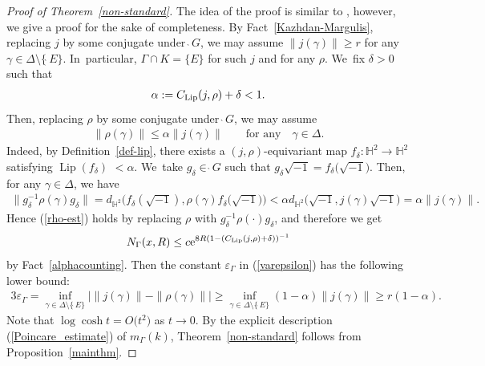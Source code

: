\documentclass[pdftex]{sigma}
\numberwithin{equation}{section}
\begin{document}
\begin{proof}[Proof of Theorem~\ref{non-standard}]
The idea of the proof is similar to \cite[Theorem~9.9]{KaKob16},
however, we give a proof for the sake of completeness.
By Fact~\ref{Kazhdan-Margulis},
replacing $j$ by some conjugate under $\grave{\ }G$,
we may assume $\|j(\gamma)\|\geq r$ for any
$\gamma\in\Delta\setminus\{\grave{\ }E\}$. In~particular, $\Gamma\cap K=\{E\}$ for such $j$ and for any $\rho$. We~fix $\delta>0$ such that
\begin{gather*}
\alpha := C_{\rm Lip}(j,\rho) + \delta<1.
\end{gather*}
Then, replacing $\rho$ by some conjugate under $\grave{\ }G$,
we may assume
\begin{gather}
\label{rho-est}
\|\rho(\gamma)\| \leq \alpha \|j(\gamma)\|\qquad
\text{for any} \quad\gamma\in\Delta.
\end{gather}
Indeed, by Definition~\ref{def-lip},
there exists a $(j,\rho)$-equivariant map
$f_{\delta}\colon\mathbb{H}^2\rightarrow\mathbb{H}^2$
satisfying $\operatorname{Lip}(f_{\delta})$ $< \alpha$. We~take $g_{\delta}\in\grave{\ }G$ such that $g_{\delta}\sqrt{-1}=f_{\delta}\big(\sqrt{-1}\big)$.
Then, for any $\gamma\in\Delta$, we have
\begin{gather*}
\big\|g_{\delta}^{-1}\rho(\gamma)g_{\delta}\big\| =
d_{\mathbb{H}^{2}}\big(f_{\delta}(\sqrt{-1}), \rho(\gamma)f_{\delta}\big(\sqrt{-1}\big)\big)
< \alpha d_{\mathbb{H}^{2}}\big(\sqrt{-1},j(\gamma)\sqrt{-1}\big)
=\alpha \|j(\gamma)\|.
\end{gather*}
Hence (\ref{rho-est}) holds by replacing $\rho$ with $g_{\delta}^{-1}\rho(\cdot)g_{\delta}$,
and therefore we get
\begin{gather*}
N_{\Gamma}(x,R) \leq c{\rm e}^{8R(1-(C_{\rm Lip}(j,\rho)+\delta))^{-1}}
\end{gather*}
by Fact~\ref{alphacounting}. Then the constant $\varepsilon_{\Gamma}$
in (\ref{varepsilon}) has the following lower bound:
\begin{gather*}
3\varepsilon_{\Gamma}
=\inf_{\gamma\in\Delta\setminus\{\grave{\ }E\}}
\left|\|j(\gamma)\| - \|\rho(\gamma)\|\right|
\geq \inf_{\gamma\in\Delta\setminus\{\grave{\ }E\}}(1-\alpha)
\|j(\gamma)\| \geq r(1-\alpha).
\end{gather*}
Note that
$\log\cosh t=O\big(t^{2}\big)$ as $t\to0$.
By the explicit description (\ref{Poincare_estimate})
of $m_{\Gamma}(k)$,
Theorem~\ref{non-standard} follows from Proposition~\ref{mainthm}.
\end{proof}
\end{document}
